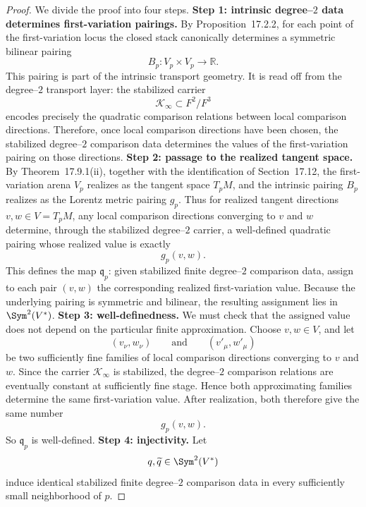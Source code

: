 \begin{proof}
	We divide the proof into four steps.
	\medskip
	\noindent
	\textbf{Step 1: intrinsic degree--\(2\) data determines first-variation
		pairings.}
	By Proposition~17.2.2, for each point of the first-variation locus the
	closed stack canonically determines a symmetric bilinear pairing
	\[
		B_p:V_p\times V_p\to\mathbb R.
	\]
	This pairing is part of the intrinsic transport geometry.
	It is read off from the degree--\(2\) transport layer: the stabilized
	carrier
	\[
		\mathcal K_\infty\subset F^2/F^3
	\]
	encodes precisely the quadratic comparison relations between local
	comparison directions.
	Therefore, once local comparison directions have been chosen, the
	stabilized degree--\(2\) comparison data determines the values of the
	first-variation pairing on those directions.
	\medskip
	\noindent
	\textbf{Step 2: passage to the realized tangent space.}
	By Theorem~17.9.1(ii), together with the identification of
	Section~17.12, the first-variation arena \(V_p\) realizes as the tangent
	space \(T_pM\), and the intrinsic pairing \(B_p\) realizes as the
	Lorentz metric pairing \(g_p\).
	Thus for realized tangent directions \(v,w\in V=T_pM\), any local
	comparison directions converging to \(v\) and \(w\) determine, through
	the stabilized degree--\(2\) carrier, a well-defined quadratic pairing
	whose realized value is exactly
	\[
		g_p(v,w).
	\]
	This defines the map \(\mathfrak q_p\): given stabilized finite
	degree--\(2\) comparison data, assign to each pair \((v,w)\) the
	corresponding realized first-variation value.
	Because the underlying pairing is symmetric and bilinear, the resulting
	assignment lies in \(\Sym^2(V^*)\).
	\medskip
	\noindent
	\textbf{Step 3: well-definedness.}
	We must check that the assigned value does not depend on the particular
	finite approximation.
	Choose \(v,w\in V\), and let
	\[
		(v_\nu,w_\nu)
		\qquad\text{and}\qquad
		(v'_\mu,w'_\mu)
	\]
	be two sufficiently fine families of local comparison directions
	converging to \(v\) and \(w\).
	Since the carrier \(\mathcal K_\infty\) is stabilized, the degree--\(2\)
	comparison relations are eventually constant at sufficiently fine stage.
	Hence both approximating families determine the same first-variation
	value.
	After realization, both therefore give the same number
	\[
		g_p(v,w).
	\]
	So \(\mathfrak q_p\) is well-defined.
	\medskip
	\noindent
	\textbf{Step 4: injectivity.}
	Let
	\[
		q,\widetilde q\in\Sym^2(V^*)
	\]
	induce identical stabilized finite degree--\(2\) comparison data in every
	sufficiently small neighborhood of \(p\).

\end{proof}
